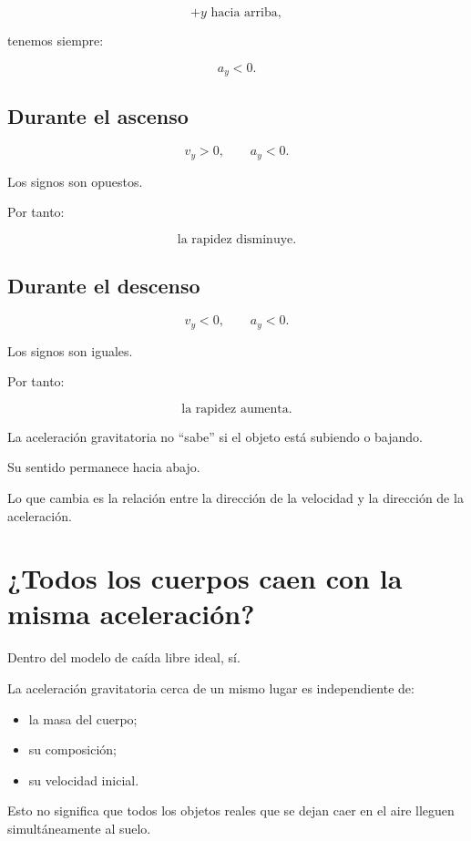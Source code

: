 \[ +y\text{ hacia arriba}, \]

tenemos siempre:

\[ a_y<0. \]


\subsection{Durante el ascenso}

\[ v_y>0,\qquad a_y<0. \]

Los signos son opuestos.

Por tanto:

\[ \boxed{\text{la rapidez disminuye}}. \]


\subsection{Durante el descenso}

\[ v_y<0,\qquad a_y<0. \]

Los signos son iguales.

Por tanto:

\[ \boxed{\text{la rapidez aumenta}}. \]

\begin{interpretacion}
La aceleración gravitatoria no ``sabe'' si el objeto está subiendo o bajando.

Su sentido permanece hacia abajo.

Lo que cambia es la relación entre la dirección de la velocidad y la dirección de la aceleración.
\end{interpretacion}


\section{¿Todos los cuerpos caen con la misma aceleración?}

Dentro del modelo de caída libre ideal, sí.

La aceleración gravitatoria cerca de un mismo lugar es independiente de:

\begin{itemize}
    \item la masa del cuerpo;
    \item su composición;
    \item su velocidad inicial.
\end{itemize}

Esto no significa que todos los objetos reales que se dejan caer en el aire lleguen simultáneamente al suelo.


